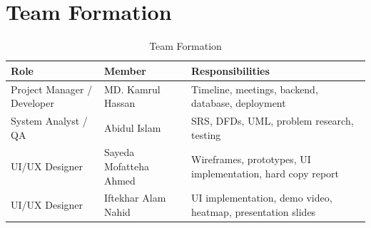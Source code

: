 \section{Team Formation}
\begin{table}[H]
\centering
\caption{Team Formation}
\label{tab:team-formation}
\begin{tabularx}{\textwidth}{@{}lXX@{}}
\toprule
Role & Member & Responsibilities \\
\midrule
Project Manager / Developer & MD. Kamrul Hassan & Timeline, meetings, backend, database, deployment \\
System Analyst / QA & Abidul Islam & SRS, DFDs, UML, problem research, testing \\
UI/UX Designer & Sayeda Mofatteha Ahmed & Wireframes, prototypes, UI implementation, hard copy report \\
UI/UX Designer & Iftekhar Alam Nahid & UI implementation, demo video, heatmap, presentation slides \\
\bottomrule
\end{tabularx}
\end{table}
